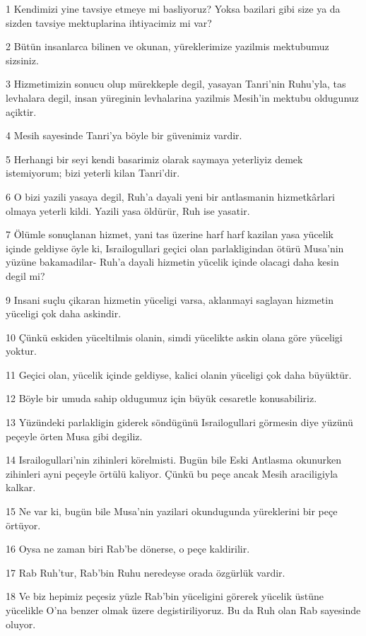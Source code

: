 \par 1 Kendimizi yine tavsiye etmeye mi basliyoruz? Yoksa bazilari gibi size ya da sizden tavsiye mektuplarina ihtiyacimiz mi var?
\par 2 Bütün insanlarca bilinen ve okunan, yüreklerimize yazilmis mektubumuz sizsiniz.
\par 3 Hizmetimizin sonucu olup mürekkeple degil, yasayan Tanri'nin Ruhu'yla, tas levhalara degil, insan yüreginin levhalarina yazilmis Mesih'in mektubu oldugunuz açiktir.
\par 4 Mesih sayesinde Tanri'ya böyle bir güvenimiz vardir.
\par 5 Herhangi bir seyi kendi basarimiz olarak saymaya yeterliyiz demek istemiyorum; bizi yeterli kilan Tanri'dir.
\par 6 O bizi yazili yasaya degil, Ruh'a dayali yeni bir antlasmanin hizmetkârlari olmaya yeterli kildi. Yazili yasa öldürür, Ruh ise yasatir.
\par 7 Ölümle sonuçlanan hizmet, yani tas üzerine harf harf kazilan yasa yücelik içinde geldiyse öyle ki, Israilogullari geçici olan parlakligindan ötürü Musa'nin yüzüne bakamadilar- Ruh'a dayali hizmetin yücelik içinde olacagi daha kesin degil mi?
\par 9 Insani suçlu çikaran hizmetin yüceligi varsa, aklanmayi saglayan hizmetin yüceligi çok daha askindir.
\par 10 Çünkü eskiden yüceltilmis olanin, simdi yücelikte askin olana göre yüceligi yoktur.
\par 11 Geçici olan, yücelik içinde geldiyse, kalici olanin yüceligi çok daha büyüktür.
\par 12 Böyle bir umuda sahip oldugumuz için büyük cesaretle konusabiliriz.
\par 13 Yüzündeki parlakligin giderek söndügünü Israilogullari görmesin diye yüzünü peçeyle örten Musa gibi degiliz.
\par 14 Israilogullari'nin zihinleri körelmisti. Bugün bile Eski Antlasma okunurken zihinleri ayni peçeyle örtülü kaliyor. Çünkü bu peçe ancak Mesih araciligiyla kalkar.
\par 15 Ne var ki, bugün bile Musa'nin yazilari okundugunda yüreklerini bir peçe örtüyor.
\par 16 Oysa ne zaman biri Rab'be dönerse, o peçe kaldirilir.
\par 17 Rab Ruh'tur, Rab'bin Ruhu neredeyse orada özgürlük vardir.
\par 18 Ve biz hepimiz peçesiz yüzle Rab'bin yüceligini görerek yücelik üstüne yücelikle O'na benzer olmak üzere degistiriliyoruz. Bu da Ruh olan Rab sayesinde oluyor.

